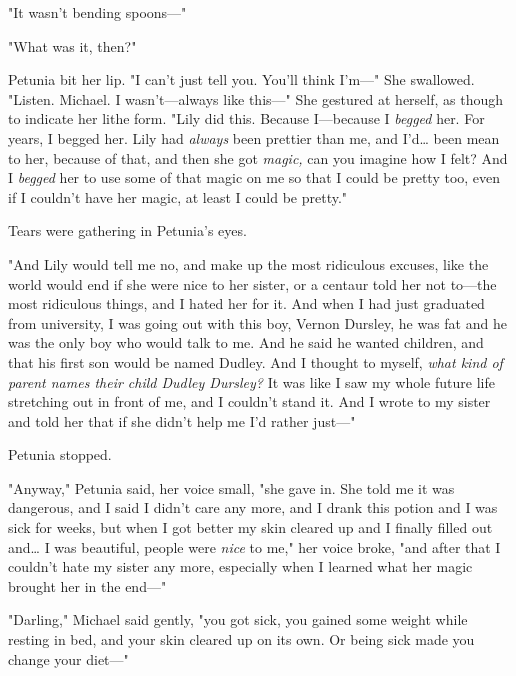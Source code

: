 "It wasn't bending spoons---"

"What was it, then?"

Petunia bit her lip. "I can't just tell you. You'll think I'm---" She
swallowed. "Listen. Michael. I wasn't---always like this---" She gestured at
herself, as though to indicate her lithe form. "Lily did this. Because
I---because I \emph{begged} her. For years, I begged her. Lily had
\emph{always} been prettier than me, and I'd{\ldots} been mean to her, because
of that, and then she got \emph{magic,} can you imagine how I felt? And I
\emph{begged} her to use some of that magic on me so that I could be pretty
too, even if I couldn't have her magic, at least I could be pretty."

Tears were gathering in Petunia's eyes.

"And Lily would tell me no, and make up the most ridiculous excuses, like the
world would end if she were nice to her sister, or a centaur told her not
to---the most ridiculous things, and I hated her for it. And when I had just
graduated from university, I was going out with this boy, Vernon Dursley, he
was fat and he was the only boy who would talk to me. And he said he wanted
children, and that his first son would be named Dudley. And I thought to
myself, \emph{what kind of parent names their child Dudley Dursley?} It was
like I saw my whole future life stretching out in front of me, and I couldn't
stand it. And I wrote to my sister and told her that if she didn't help me I'd
rather just---"

Petunia stopped.

"Anyway," Petunia said, her voice small, "she gave in. She told me it was
dangerous, and I said I didn't care any more, and I drank this potion and I was
sick for weeks, but when I got better my skin cleared up and I finally filled
out and{\ldots} I was beautiful, people were \emph{nice} to me," her voice
broke, "and after that I couldn't hate my sister any more, especially when I
learned what her magic brought her in the end---"

"Darling," Michael said gently, "you got sick, you gained some weight while
resting in bed, and your skin cleared up on its own. Or being sick made you
change your diet---"

